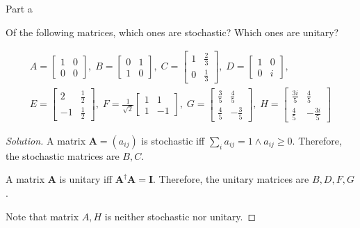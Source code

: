 \begin{solution}{Part a}\label{ques:1a}
  \begin{question}
    Of the following matrices, which ones are stochastic? Which
    ones are unitary?

    \begin{gather*}
    A =
    \begin{bmatrix}
    1 & 0\\
    0 & 0
    \end{bmatrix}\!,\;
    B=
    \begin{bmatrix}
    0 & 1\\
    1 & 0
    \end{bmatrix}\!,\;
    C=
    \begin{bmatrix}
    1 & \frac{2}{3}\\[0.1em]
    0 & \frac{1}{3}
    \end{bmatrix}\!,\;
    D=
    \begin{bmatrix}
    1 & 0\\
    0 & i
    \end{bmatrix}\!,\\
    E =
    \begin{bmatrix}
    2 & \frac{1}{2}\\[0.1em]
    -1 & \frac{1}{2}
    \end{bmatrix}\!,\;
    F = \frac{1}{\sqrt{2}}
    \begin{bmatrix}
    1 & 1\\
    1 & -1
    \end{bmatrix}\!,\;
    G=
    \begin{bmatrix}
    \frac{3}{5} & \frac{4}{5}\\[0.1em]
    \frac{4}{5} & -\frac{3}{5}
    \end{bmatrix}\!,\;
    H=
    \begin{bmatrix}
    \frac{3i}{5} & \frac{4}{5}\\[0.1em]
    \frac{4}{5} & -\frac{3i}{5}
    \end{bmatrix}
    \end{gather*}
  \end{question}
  \tcblower{}
  \begin{proof}[Solution]
    A matrix $\mathbf{A} = (a_{ij})$ is stochastic iff $\sum_{i} a_{ij} = 1 \wedge a_{ij} \geq 0$. Therefore, the stochastic matrices are $B, C$.\par
    A matrix $\mathbf{A}$ is unitary iff $\mathbf{A}^\dag\mathbf{A} = \mathbf{I}$. Therefore, the unitary matrices are $B, D, F, G$.\par
    Note that matrix $A, H$ is neither stochastic nor unitary.
  \end{proof}
\end{solution}

